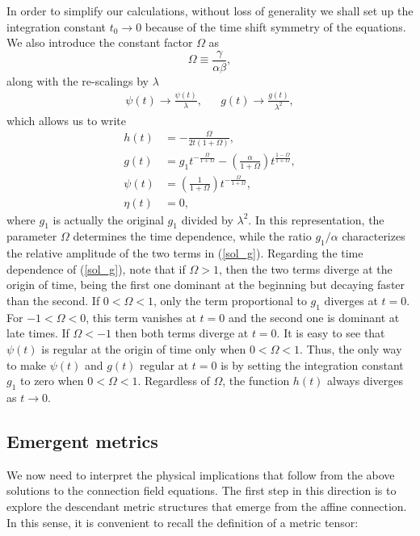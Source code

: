 \documentclass[epj]{svjour}
\begin{document}
In order to simplify our calculations, without loss of generality we shall set up the integration constant $t_0 \to 0$ because of the time shift symmetry of the equations. We also introduce the constant factor $\Omega$ as
\begin{equation}
\Omega \equiv \frac{\gamma}{\alpha\beta},
\end{equation}
along with the re-scalings by $\lambda$
\begin{align}
\psi(t) \to \frac{\psi(t)}{\lambda}, && g(t) \to \frac{g(t)}{\lambda^2},
\end{align}
which allows us to write 
\begin{align}
	h(t) & = -\frac{\Omega}{2t\left(1 + \Omega\right)}, \label{sol_h}\\
	g(t) & = g_1 t^{-\frac{\Omega}{1 + \Omega}} - \left(\frac{\alpha}{1 + \Omega}\right) t^{\frac{1 - \Omega}{1 + \Omega}}, \label{sol_g} \\
	\psi(t) & =\left(\frac{1}{1 + \Omega}\right)t^{-\frac{\Omega}{1 + \Omega}},  \label{sol_p}\\ 
	\eta(t) & = 0, \label{sol_n}
\end{align}
where $g_1$ is actually the original $g_1$ divided by $\lambda^2$. In this representation, the parameter $\Omega$ determines the time dependence, while the ratio $g_1/\alpha$ characterizes the relative amplitude of the two terms in (\ref{sol_g}). Regarding the time dependence of (\ref{sol_g}), note that if $\Omega>1$, then the two terms diverge at the origin of time, being the first one dominant at the beginning but decaying faster than the second. If $0<\Omega<1$, only the term proportional to $g_1$ diverges at $t=0$. For $-1<\Omega<0$, this term vanishes at $t=0$ and the second one is dominant at late times. If $\Omega<-1$  then both terms diverge at $t=0$. It is easy to see that  $\psi(t)$ is regular at the origin of time only when $0<\Omega<1$. Thus, the only way to make $\psi(t)$ and $g(t)$ regular at $t=0$ is by setting the integration constant $g_1$ to zero when $0<\Omega<1$. Regardless of $\Omega$, the function $h(t)$ always diverges as $t\to 0$.


\subsection{Emergent metrics}
We now need to interpret the physical implications that follow from the above solutions to the connection field equations. The first step in this direction is to explore the descendant metric structures that emerge from the affine connection. In this sense, it is convenient to recall the definition of a metric tensor:
\end{document}
